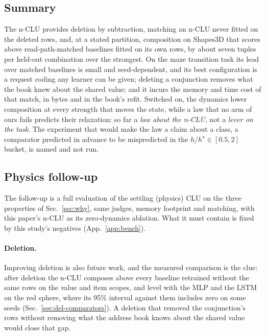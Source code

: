 \documentclass{article} %
\begin{document}
\subsection{Summary}
\label{sec:leaving}

The n-CLU provides deletion by subtraction, matching an n-CLU never fitted on the deleted rows, and, at a stated partition, composition on
Shapes3D that scores above read-path-matched baselines fitted on its own rows, by about seven tuples per
held-out combination over the strongest. On the maze transition task its lead over matched
baselines is small and seed-dependent, and its best configuration is a request coding any learner can be
given; deleting a conjunction removes what the book knew about the shared value; and it incurs the
memory and time cost of that match, in bytes and in the book's refit. Switched on, the dynamics lower composition at
every strength that moves the state, while a law that no arm of ours fails predicts their relaxation:
so far a \emph{law about the n-CLU}, not a \emph{lever on the task}. The experiment that would make
the law a claim about a class, a comparator predicted in advance to be mispredicted in the
$h/h^\star\in[0.5,2]$ bucket, is named and not run. %

\subsection{Physics follow-up}
\label{sec:followup}

The follow-up is a full evaluation of the settling (physics) CLU on the three properties of
Sec.~\ref{sec:why}, same judges, memory footprint and matching, with this paper's n-CLU as its zero-dynamics
ablation. What it must contain is fixed by this study's negatives (App.~\ref{app:bench}).

\paragraph{Deletion.} Improving deletion is also future work, and the measured comparison is
the clue: after deletion the n-CLU composes above every baseline retrained without the same rows on
the value and item scopes, and level with the MLP and the LSTM on the red sphere, where its 95\% %
interval against them includes zero on some seeds (Sec.~\ref{sec:del-comparators}). A deletion that
removed the conjunction's rows without removing what the address book knows about the shared value
would close that gap.
\end{document}
